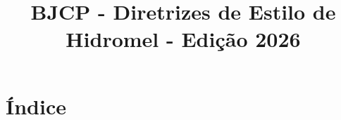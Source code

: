 \documentclass[a4paper, 9t]{article}
\title{BJCP - Diretrizes de Estilo de Hidromel - Edição 2026}
\renewcommand*\contentsname{}
\begin{document}
\raggedcolumns


\section*{Índice}
\renewcommand\contentsname{}
\tableofcontents







\end{document}
